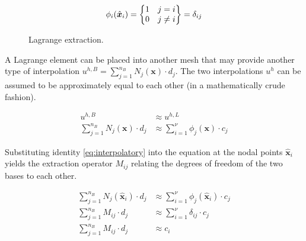 \begin{equation}
\label{eq:interpolatory}
    \phi_i(\hat{\bm{x}}_i) =
    \left\{
    \begin{array}{@{}c@{}}
        1 ~~~ j=i \\
        0 ~~~ j \neq i
    \end{array} 
    \right\} 
    = \delta_{ij}
\end{equation}
    
\begin{figure}[h]
    \vspace{0.2cm}
    \begin{center}
    
    \caption{Lagrange extraction.} 
    \label{fig:lagrange_extraction}
    \end{center}
\end{figure}

A Lagrange element can be placed into another mesh that may provide another type of interpolation $u^{h,B} = \sum_{j=1}^{n_B} N_j(\bm{x}) \cdot d_j$. The two interpolations $u^{h}$ can be assumed to be approximately equal to each other (in a mathematically crude fashion).

\begin{equation}
\label{eq:approx}
\begin{split}
    u^{h,B} 
    &\approx u^{h,L} \\
    \sum_{j=1}^{n_B} N_j(\bm{x}) \cdot d_j 
    &\approx \sum_{i=1}^{\nu} \phi_j(\bm{x}) \cdot c_j
\end{split}
\end{equation}

Substituting identity \eqref{eq:interpolatory} into the equation at the nodal points $\hat{\bm{x}}_i$ yields the extraction operator $M_{ij}$ relating the degrees of freedom of the two bases to each other.

\begin{equation}
    \label{eq:derive_extraction_operator}
    \begin{split}
        \sum_{j=1}^{n_B} N_j(\hat{\bm{x}}_i) \cdot d_j 
        &\approx \sum_{i=1}^{\nu} \phi_j(\hat{\bm{x}}_i) \cdot c_j \\
        \sum_{j=1}^{n_B} M_{ij} \cdot d_j 
        &\approx \sum_{i=1}^{\nu} \delta_{ij} \cdot c_j \\
        \sum_{j=1}^{n_B} M_{ij} \cdot d_j 
        &\approx c_i \\
    \end{split}
\end{equation}

